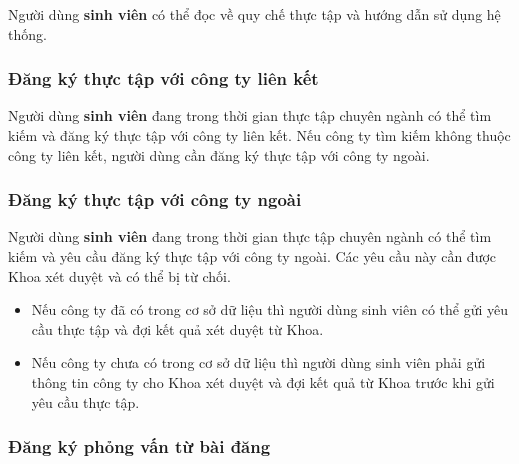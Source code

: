 \documentclass[./../main.tex]{subfiles}
\begin{document}
Người dùng \textbf{sinh viên} có thể đọc về quy chế thực tập và hướng
dẫn sử dụng hệ thống.

\hypertarget{ux111ux103ng-kuxfd-thux1ef1c-tux1eadp-vux1edbi-cuxf4ng-ty-liuxean-kux1ebft}{%
	\subsubsection{Đăng ký thực tập với công ty liên
		kết}\label{ux111ux103ng-kuxfd-thux1ef1c-tux1eadp-vux1edbi-cuxf4ng-ty-liuxean-kux1ebft}}

Người dùng \textbf{sinh viên} đang trong thời gian thực tập chuyên ngành
có thể tìm kiếm và đăng ký thực tập với công ty liên kết. Nếu công ty
tìm kiếm không thuộc công ty liên kết, người dùng cần đăng ký thực tập
với công ty ngoài.

\hypertarget{ux111ux103ng-kuxfd-thux1ef1c-tux1eadp-vux1edbi-cuxf4ng-ty-ngouxe0i}{%
	\subsubsection{Đăng ký thực tập với công ty
		ngoài}\label{ux111ux103ng-kuxfd-thux1ef1c-tux1eadp-vux1edbi-cuxf4ng-ty-ngouxe0i}}

Người dùng \textbf{sinh viên} đang trong thời gian thực tập chuyên ngành
có thể tìm kiếm và yêu cầu đăng ký thực tập với công ty ngoài. Các yêu
cầu này cần được Khoa xét duyệt và có thể bị từ chối.

\begin{itemize}
	\item

	      Nếu công ty đã có trong cơ sở dữ liệu thì người dùng sinh viên có thể
	      gửi yêu cầu thực tập và đợi kết quả xét duyệt từ Khoa.

	\item

	      Nếu công ty chưa có trong cơ sở dữ liệu thì người dùng sinh viên phải
	      gửi thông tin công ty cho Khoa xét duyệt và đợi kết quả từ Khoa trước
	      khi gửi yêu cầu thực tập.

\end{itemize}

\hypertarget{ux111ux103ng-kuxfd-phux1ecfng-vux1ea5n-tux1eeb-buxe0i-ux111ux103ng}{%
	\subsubsection{Đăng ký phỏng vấn từ bài
		đăng}\label{ux111ux103ng-kuxfd-phux1ecfng-vux1ea5n-tux1eeb-buxe0i-ux111ux103ng}}
\end{document}
